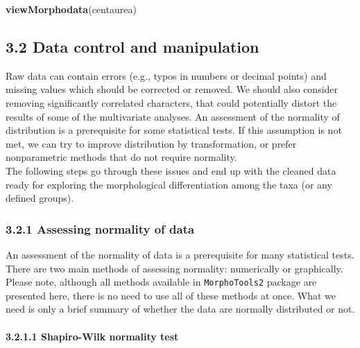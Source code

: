 \documentclass[
]{article}
\newenvironment{Shaded}{\begin{snugshade}}{\end{snugshade}}
\newcommand{\KeywordTok}[1]{\textcolor[rgb]{0.13,0.29,0.53}{\textbf{#1}}}
\newcommand{\NormalTok}[1]{#1}
\begin{document}
\begin{Shaded}
\begin{Highlighting}[]
\KeywordTok{viewMorphodata}\NormalTok{(centaurea)}
\end{Highlighting}
\end{Shaded}

\hypertarget{data-control-and-manipulation}{%
\subsection{3.2 Data control and
manipulation}\label{data-control-and-manipulation}}

Raw data can contain errors (e.g., typos in numbers or decimal points)
and missing values which should be corrected or removed. We should also
consider removing significantly correlated characters, that could
potentially distort the results of some of the multivariate analyses. An
assessment of the normality of distribution is a prerequisite for some
statistical tests. If this assumption is not met, we can try to improve
distribution by transformation, or prefer nonparametric methods that do
not require normality.\\
The following steps go through these issues and end up with the cleaned
data ready for exploring the morphological differentiation among the
taxa (or any defined groups).

\hypertarget{assessing-normality-of-data}{%
\subsubsection{3.2.1 Assessing normality of
data}\label{assessing-normality-of-data}}

An assessment of the normality of data is a prerequisite for many
statistical tests. There are two main methods of assessing normality:
numerically or graphically.\\
Please note, although all methods available in \texttt{MorphoTools2}
package are presented here, there is no need to use all of these methods
at once. What we need is only a brief summary of whether the data are
normally distributed or not.

\hypertarget{shapiro-wilk-normality-test}{%
\paragraph{3.2.1.1 Shapiro-Wilk normality
test}\label{shapiro-wilk-normality-test}}

~
\end{document}
